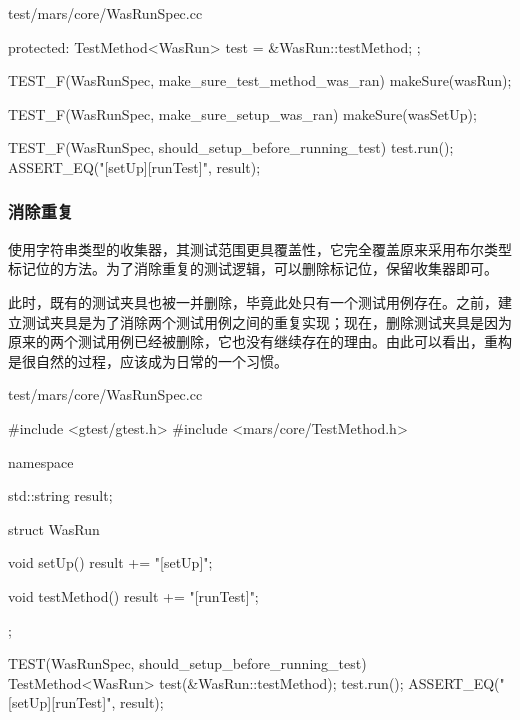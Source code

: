 \begin{content}
\begin{nodiff}{test/mars/core/WasRunSpec.cc}
\begin{c++}
{{  protected:
    TestMethod<WasRun> test = &WasRun::testMethod;
  };
}

TEST_F(WasRunSpec, make_sure_test_method_was_ran) {
  makeSure(wasRun);
}

TEST_F(WasRunSpec, make_sure_setup_was_ran) {
  makeSure(wasSetUp);
}

TEST_F(WasRunSpec, should_setup_before_running_test) {
  test.run();
  ASSERT_EQ("[setUp][runTest]", result);
}
\end{c++}
\end{nodiff}

\subsubsection{消除重复}

使用字符串类型的收集器，其测试范围更具覆盖性，它完全覆盖原来采用布尔类型标记位的方法。为了消除重复的测试逻辑，可以删除标记位，保留收集器即可。

此时，既有的测试夹具也被一并删除，毕竟此处只有一个测试用例存在。之前，建立测试夹具是为了消除两个测试用例之间的重复实现；现在，删除测试夹具是因为原来的两个测试用例已经被删除，它也没有继续存在的理由。由此可以看出，重构是很自然的过程，应该成为日常的一个习惯。

\begin{nodiff}{test/mars/core/WasRunSpec.cc}
\begin{c++}
#include <gtest/gtest.h>
#include <mars/core/TestMethod.h>

namespace {
  std::string result;

  struct WasRun {
    void setUp() {
      result += "[setUp]";
    }

    void testMethod() {
      result += "[runTest]";
    }
  };
}

TEST(WasRunSpec, should_setup_before_running_test) {
  TestMethod<WasRun> test(&WasRun::testMethod);
  test.run();
  ASSERT_EQ("[setUp][runTest]", result);
}
\end{c++}
\end{nodiff}




\end{content}
